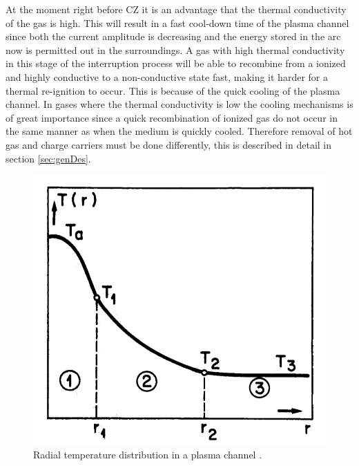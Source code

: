 \documentclass[10pt,a4paper]{article} %
\begin{document}
At the moment right before CZ it is an advantage that the thermal conductivity of the gas is high. This will result in a fast cool-down time of the plasma channel since both the current amplitude is decreasing and the energy stored in the arc now is permitted out in the surroundings. A gas with high thermal conductivity in this stage of the interruption process will be able to recombine from a ionized and highly conductive to a non-conductive state fast, making it harder for a thermal re-ignition to occur. This is because of the quick cooling of the plasma channel. In gases where the thermal conductivity is low the cooling mechanisms is of great importance since a quick recombination of ionized gas do not occur in the same manner as when the medium is quickly cooled. Therefore removal of hot gas and charge carriers must be done differently, this is described in detail in section \ref{sec:genDes}.

\begin{figure}[H]
\centering
\includegraphics[scale=0.3]{Bilder/Theory/tempZonesArc.png}
\caption{Radial temperature distribution in a plasma channel \cite{bib:TDCIGBB}.} \label{fig:tempDist1}
\end{figure}
\end{document}

